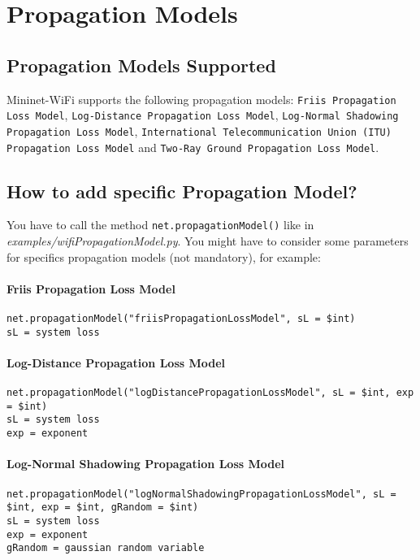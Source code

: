 \chapter{Propagation Models}
\section{Propagation Models Supported}
Mininet-WiFi supports the following propagation models: \texttt{Friis Propagation Loss Model}, \texttt{Log-Distance Propagation Loss Model}, \texttt{Log-Normal Shadowing Propagation Loss Model}, \texttt{International Telecommunication Union (ITU) Propagation Loss Model} and \texttt{Two-Ray Ground Propagation Loss Model}.

\section{How to add specific Propagation Model?}
You have to call the method \texttt{net.propagationModel()} like in \textit{examples/wifiPropagationModel.py}. You might have to consider some parameters for specifics propagation models (not mandatory), for example:

\subsubsection{Friis Propagation Loss Model}
\begin{verbatim}
net.propagationModel("friisPropagationLossModel", sL = $int) 
sL = system loss
\end{verbatim}

\subsubsection{Log-Distance Propagation Loss Model}
\begin{verbatim}
net.propagationModel("logDistancePropagationLossModel", sL = $int, exp = $int) 
sL = system loss
exp = exponent
\end{verbatim}

\subsubsection{Log-Normal Shadowing Propagation Loss Model}
\begin{verbatim}
net.propagationModel("logNormalShadowingPropagationLossModel", sL = $int, exp = $int, gRandom = $int) 
sL = system loss
exp = exponent
gRandom = gaussian random variable
\end{verbatim}

